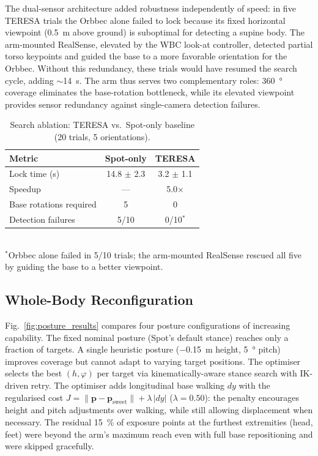 The dual-sensor architecture added robustness independently of speed: in
five \ac{TERESA} trials the Orbbec alone failed to lock because its fixed
horizontal viewpoint (\SI{0.5}{\metre} above ground) is suboptimal for
detecting a supine body. The arm-mounted RealSense, elevated by the
\ac{WBC} look-at controller, detected partial torso keypoints and guided the
base to a more favorable orientation for the Orbbec. Without this
redundancy, these trials would have resumed the search cycle, adding
$\sim$\SI{14}{\second}. The arm thus serves two complementary roles:
\SI{360}{\degree} coverage eliminates the base-rotation bottleneck, while
its elevated viewpoint provides sensor redundancy against single-camera
detection failures.

\begin{table}[h!]
  \centering
  \caption{Search ablation: \ac{TERESA} vs.\ Spot-only baseline (20 trials,
           5 orientations).}
  \label{tab:search}
  \begin{tabular}{lcc}
    \toprule
    Metric & Spot-only & \ac{TERESA} \\
    \midrule
    Lock time (s) & 14.8 $\pm$ 2.3 & 3.2 $\pm$ 1.1 \\
    Speedup & --- & 5.0$\times$ \\
    Base rotations required & 5 & 0 \\
    Detection failures & 5/10 & 0/10$^*$ \\
    \bottomrule
  \end{tabular}
  \\[4pt]
  \footnotesize $^*$Orbbec alone failed in 5/10 trials; the arm-mounted
  RealSense rescued all five by guiding the base to a better viewpoint.
\end{table}

\subsection{Whole-Body Reconfiguration}
\label{sec:body_reconf_results}

Fig.~\ref{fig:posture_results} compares four posture configurations of
increasing capability. The fixed nominal posture (Spot's default stance)
reaches only a fraction of targets. A single heuristic posture
(\SI{-0.15}{\metre} height, \SI{5}{\degree} pitch) improves coverage but
cannot adapt to varying target positions. The 
optimiser selects the best $(h, \varphi)$ per target via
kinematically-aware stance search with \ac{IK}-driven retry. The
 optimiser adds longitudinal base walking
$dy$ with the regularised cost
$J = \|\mathbf{p} - \mathbf{p}_{\mathrm{sweet}}\| + \lambda\,|dy|$
($\lambda = 0.50$): the penalty encourages height and pitch adjustments over
walking, while still allowing displacement when necessary. The residual
\SI{15}{\percent} of exposure points at the furthest extremities (head,
feet) were beyond the arm's maximum reach even with full base repositioning and were skipped gracefully.

